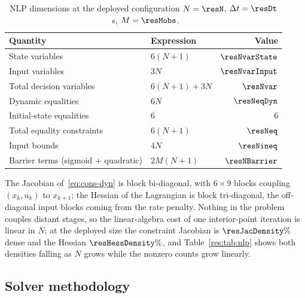 \documentclass[11pt,a4paper]{article}
\begin{document}
\begin{table}[htbp]
  \centering
  \small
  \caption{NLP dimensions at the deployed configuration $N=\resN$, $\Delta t=\resDt$~s, $M=\resMobs$.}
  \label{tab:dims}
  \begin{tabular}{llr}
    \toprule
    Quantity & Expression & Value \\
    \midrule
    State variables            & $6(N+1)$        & $\resNvarState$ \\
    Input variables            & $3N$            & $\resNvarInput$ \\
    Total decision variables   & $6(N+1)+3N$     & $\mathbf{\resNvar}$ \\
    Dynamic equalities         & $6N$            & $\resNeqDyn$ \\
    Initial-state equalities   & $6$             & $6$ \\
    Total equality constraints & $6(N+1)$        & $\mathbf{\resNeq}$ \\
    Input bounds               & $4N$            & $\mathbf{\resNineq}$ \\
    Barrier terms (sigmoid + quadratic) & $2M(N+1)$ & $\resNBarrier$ \\
    \bottomrule
  \end{tabular}
\end{table}

The Jacobian of~\eqref{eq:cons-dyn} is block bi-diagonal, with $6\times9$ blocks coupling $(x_k,u_k)$ to
$x_{k+1}$; the Hessian of the Lagrangian is block tri-diagonal, the off-diagonal input blocks coming from
the rate penalty. Nothing in the problem couples distant stages, so the linear-algebra cost of one
interior-point iteration is linear in $N$; at the deployed size the constraint Jacobian is
$\resJacDensity\%$ dense and the Hessian $\resHessDensity\%$, and Table~\ref{res:tab:nlp} shows both
densities falling as $N$ grows while the nonzero counts grow linearly.

\begin{table}[htbp]
  \centering
  \small
  \caption{%
  Size and sparsity of the NLP against the prediction horizon, from the deployed profile. Bold: the
  deployed configuration.}
  \label{res:tab:nlp}
\end{table}

\subsection{Solver methodology}
\label{sec:solver}
\end{document}
